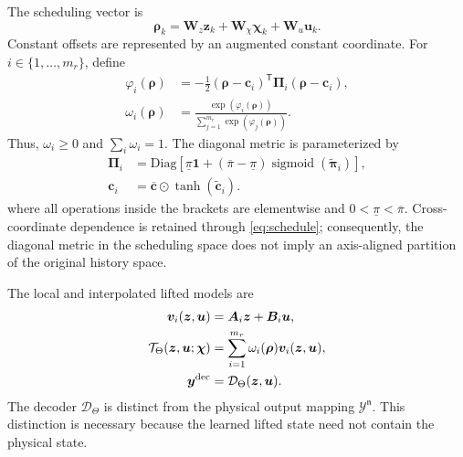 \documentclass[journal]{IEEEtran}
\newcommand{\T}{\mathsf T}
\newcommand{\1}{\bm 1}
\begin{document}
The scheduling vector is
\begin{equation}
\bm\rho_k=\bm W_z\bm z_k+\bm W_\chi\bm\chi_k+
\bm W_u\bm u_k.
\label{eq:schedule}
\end{equation}
Constant offsets are represented by an augmented constant coordinate. For
$i\in\{1,\ldots,m_r\}$, define
\begin{equation}
\begin{aligned}
\varphi_i(\bm\rho)
&=-\frac{1}{2}(\bm\rho-\bm c_i)^\T
\bm\Pi_i(\bm\rho-\bm c_i),\\
\omega_i(\bm\rho)
&=\frac{\exp(\varphi_i(\bm\rho))}
{\displaystyle\sum_{j=1}^{m_r}\exp(\varphi_j(\bm\rho))}.
\end{aligned}
\label{eq:fuzzy_weights}
\end{equation}
Thus, $\omega_i\geq0$ and $\sum_i\omega_i=1$. The diagonal metric is
parameterized by
\begin{equation}
\begin{aligned}
\bm\Pi_i&=\mathrm{Diag}\!\left[
\underline{\pi}\1+
(\overline{\pi}-\underline{\pi})
\operatorname{sigmoid}(\widetilde{\bm\pi}_i)\right],\\
\bm c_i&=\overline{\bm c}\odot\tanh(\widetilde{\bm c}_i).
\end{aligned}
\label{eq:metric_parameterization}
\end{equation}
where all operations inside the brackets are elementwise and
$0<\underline{\pi}<\overline{\pi}$. Cross-coordinate dependence is retained
through \eqref{eq:schedule}; consequently, the diagonal metric in the
scheduling space does not imply an axis-aligned partition of the original
history space.

The local and interpolated lifted models are
\begin{equation}
\begin{aligned}
\bm v_i(\bm z,\bm u)&=\bm A_i\bm z+\bm B_i\bm u,\\
\mathcal T_\Theta(\bm z,\bm u;\bm\chi)
&=\sum_{i=1}^{m_r}\omega_i(\bm\rho)\bm v_i(\bm z,\bm u),\\
\bm y^{\rm dec}&=\mathcal D_\Theta(\bm z,\bm u).
\end{aligned}
\label{eq:fuzzy_transition}
\end{equation}
The decoder $\mathcal D_\Theta$ is distinct from the physical output mapping
$\mathcal Y^{\mathfrak n}$. This distinction is necessary because the learned lifted state
need not contain the physical state.
\end{document}
